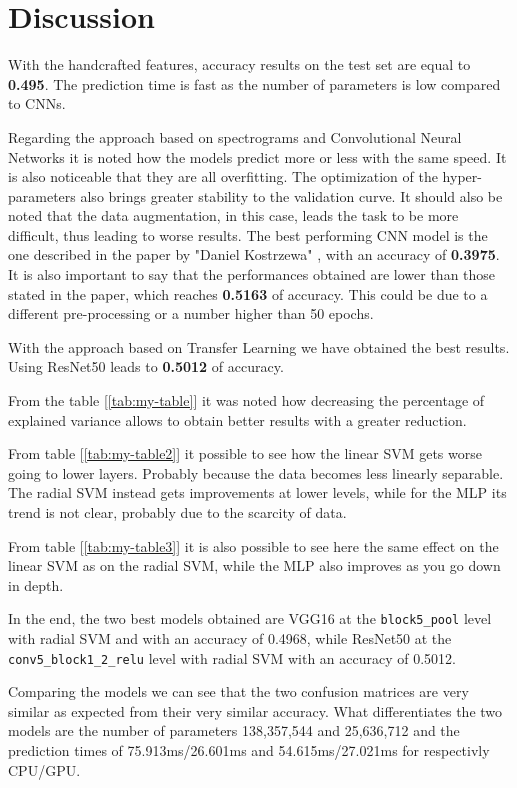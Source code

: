\section{Discussion}
With the handcrafted features, accuracy results on the test set are equal to \textbf{0.495}. 
The prediction time is fast as the number of parameters is low compared to CNNs.

Regarding the approach based on spectrograms and Convolutional Neural Networks it is noted how the models predict more or less with the same speed. It is also noticeable that they are all overfitting.
The optimization of the hyper-parameters also brings greater stability to the validation curve.
It should also be noted that the data augmentation, in this case, leads the task to be more difficult, thus leading to worse results.
The best performing CNN model is the one described in the paper by "Daniel Kostrzewa" \cite{kostrzewa2021music}, with an accuracy of \textbf{0.3975}. It is also important to say that the performances obtained are lower than those stated in the paper, which reaches \textbf{0.5163} of accuracy. This could be due to a different pre-processing or a number higher than 50 epochs.

With the approach based on Transfer Learning we have obtained the best results. Using ResNet50 leads to \textbf{0.5012} of accuracy.

From the table [\ref{tab:my-table}] it was noted how decreasing the percentage of explained variance allows to obtain better results with a greater reduction.

From table [\ref{tab:my-table2}] it possible to see how the linear SVM gets worse going to lower layers. Probably because the data becomes less linearly separable.
The radial SVM instead gets improvements at lower levels, while for the MLP its trend is not clear, probably due to the scarcity of data.

From table [\ref{tab:my-table3}] it is also possible to see here the same effect on the linear SVM as on the radial SVM, while the MLP also improves as you go down in depth.

In the end, the two best models obtained are VGG16 at the \texttt{block5\_pool} level with radial SVM and with an accuracy of 0.4968, while ResNet50 at the \texttt{conv5\_block1\_2\_relu} level with radial SVM with an accuracy of 0.5012.

\noindent
Comparing the models we can see that the two confusion matrices are very similar as expected from their very similar accuracy.
What differentiates the two models are the number of parameters 138,357,544 and 25,636,712 and the prediction times of 75.913ms/26.601ms and 54.615ms/27.021ms for respectivly CPU/GPU.

